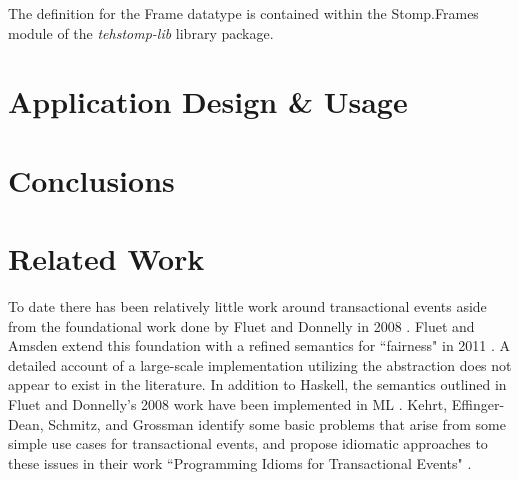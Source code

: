 \documentclass[conference, letterpaper]{IEEEtran}
\begin{document}
The definition for the Frame datatype is contained within the Stomp.Frames module of the \textit{tehstomp-lib} library package.

\section{Application Design \& Usage}

\section{Conclusions}

\section{Related Work}
To date there has been relatively little work around transactional events aside from the foundational work done by
Fluet and Donnelly in 2008 \cite{te:original}. Fluet and Amsden extend this foundation with a refined semantics  for ``fairness" in 2011 \cite{te:fairness}.
A detailed account of a large-scale implementation utilizing the abstraction does not appear to exist in the literature. 
In addition to Haskell, the semantics outlined in Fluet and Donnelly's 2008 work have been implemented in ML \cite{te:ml}. 
Kehrt, Effinger-Dean, Schmitz, and Grossman identify some basic problems that arise from some simple use cases for
transactional events, and propose idiomatic approaches to these issues in their work ``Programming Idioms for Transactional Events" \cite{te:idioms}.  



\end{document}

